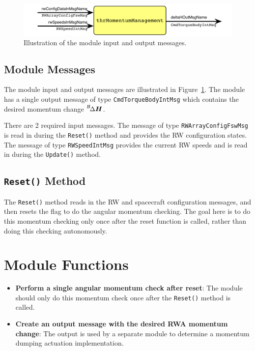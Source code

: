 \documentclass[]{BasiliskReportMemo}
\begin{document}
\begin{figure}[h]
	\centerline{
		\includegraphics{Figures/moduleImg}
	}
	\caption{Illustration of the module input and output messages.}
	\label{fig:moduleImg}
\end{figure}





\subsection{Module Messages}
The module input and output messages are illustrated in Figure~\ref{fig:moduleImg}.  The module has a single output message of type {\tt CmdTorqueBodyIntMsg} which contains the desired momentum change $\leftexp{B}{\Delta}\bm H$.  

There are 2 required input messages.  The message of type {\tt RWArrayConfigFswMsg} is read in during the {\tt Reset()} method and provides the RW configuration states.  The message of type {\tt RWSpeedIntMsg} provides the current RW speeds and is read in during the {\tt Update()} method.

\subsection{{\tt Reset()} Method}
The {\tt Reset()} method reads in the RW and spacecraft configuration messages, and then resets the flag to do the angular momentum checking.  The goal here is to do this momentum checking only once after the reset function is called, rather than doing this checking autonomously.  









\section{Module Functions}
\begin{itemize}
	\item \textbf{Perform a single angular momentum check after reset}: The module should only do this momentum check once after the {\tt Reset()} method is called.
	\item \textbf{Create an output message with the desired RWA momentum change}: The output is used by a separate module to determine a momentum dumping actuation implementation.  
\end{itemize}
\end{document}
